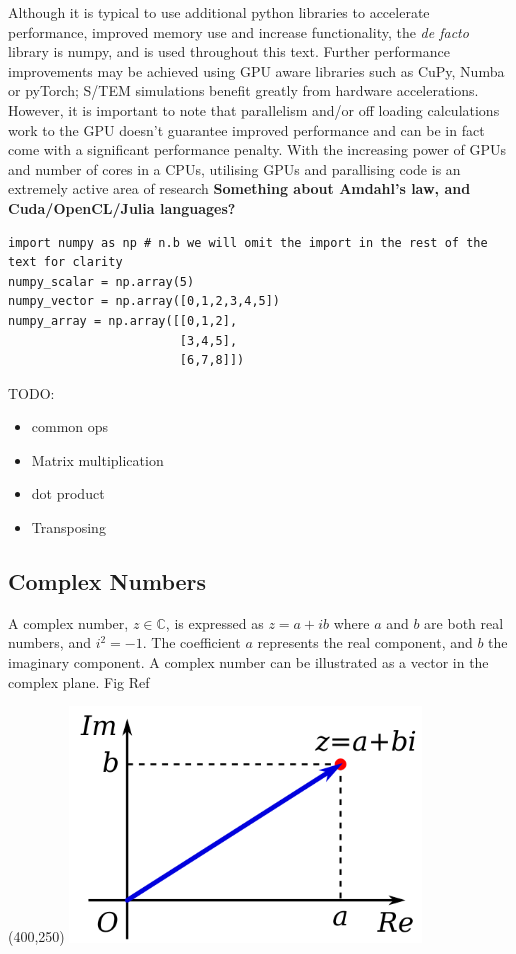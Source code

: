 \documentclass[%
 superscriptaddress,
 aip,
 amsmath,amssymb,
preprint,%
 author-year,%
longbibliography
]{revtex4-2}
\begin{document}
Although it is typical to use additional python libraries to accelerate performance, improved memory use and increase functionality, the \emph{de facto} library is numpy, and is used throughout this text. Further performance improvements may be achieved using GPU aware libraries such as CuPy, Numba or pyTorch; S/TEM simulations benefit greatly from hardware accelerations. However, it is important to note that parallelism and/or off loading calculations work to the GPU doesn't guarantee improved performance and can be in fact come with a significant performance penalty. With the increasing power of GPUs and number of cores in a CPUs, utilising GPUs and parallising code is an extremely active area of research \textbf{Something about Amdahl's law, and Cuda/OpenCL/Julia languages?}
\break

\begin{lstlisting}[caption= Examples of a scalar vector and a 2D array in using numpy Python syntax]
import numpy as np # n.b we will omit the import in the rest of the text for clarity 
numpy_scalar = np.array(5)
numpy_vector = np.array([0,1,2,3,4,5])
numpy_array = np.array([[0,1,2],
                        [3,4,5],
                        [6,7,8]])
\end{lstlisting}
 
TODO:
\begin{itemize}
    \item common ops
    \item Matrix multiplication 
    \item dot product
    \item Transposing
\end{itemize}


\subsection*{Complex Numbers}
A complex number, $z \in \mathbb{C}$, is expressed as $z = a + ib$ where $a$ and $b$ are both real numbers, and $i^2=-1$. The coefficient $a$ represents the real component, and $b$ the imaginary component. A complex number can be illustrated as a vector in the complex plane. Fig Ref 

\framebox(400,250){
\includegraphics[width=0.7\textwidth]{figures/wiki-complex.png}}
\end{document}
